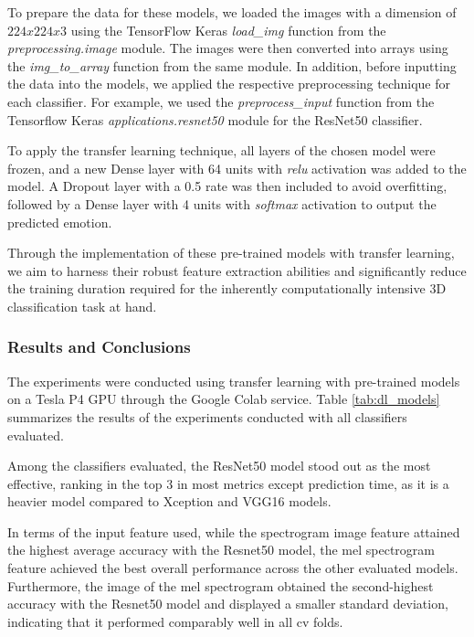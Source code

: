 To prepare the data for these models, we loaded the images with a dimension of $224x224x3$ using the TensorFlow Keras \textit{load\_img} function from the \textit{preprocessing.image} module. The images were then converted into arrays using the \textit{img\_to\_array} function from the same module. In addition, before inputting the data into the models, we applied the respective preprocessing technique for each classifier. For example, we used the \textit{preprocess\_input} function from the Tensorflow  Keras \textit{applications.resnet50} module for the ResNet50 classifier.

To apply the transfer learning technique, all layers of the chosen model were frozen, and a new Dense layer with 64 units with \textit{relu} activation was added to the model. A Dropout layer with a 0.5 rate was then included to avoid overfitting, followed by a Dense layer with 4 units with \textit{softmax} activation to output the predicted emotion.

Through the implementation of these pre-trained models with transfer learning, we aim to harness their robust feature extraction abilities and significantly reduce the training duration required for the inherently computationally intensive 3D classification task at hand.


\subsubsection{Results and Conclusions}

The experiments were conducted using transfer learning with pre-trained models on a Tesla P4 GPU through the Google Colab service. Table \ref{tab:dl_models} summarizes the results of the experiments conducted with all classifiers evaluated.

Among the classifiers evaluated, the ResNet50 model stood out as the most effective, ranking in the top 3 in most metrics except prediction time, as it is a heavier model compared to Xception and VGG16 models.

In terms of the input feature used, while the spectrogram image feature attained the highest average accuracy with the Resnet50 model, the mel spectrogram feature achieved the best overall performance across the other evaluated models. Furthermore, the image of the mel spectrogram obtained the second-highest accuracy with the Resnet50 model and displayed a smaller standard deviation, indicating that it performed comparably well in all \ac{cv} folds.


